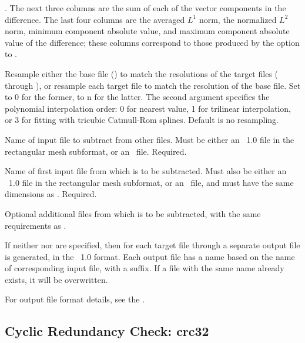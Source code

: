 \begin{description}
  .
  The next three columns are the sum of each of the vector components in
  the difference.  The last four columns are the averaged $L^1$ norm,
  the normalized $L^2$ norm, minimum component absolute value, and
  maximum component absolute value of the difference; these columns
  correspond to those produced by the  option to
  .
\item[\optkey{-resample \boa 0\pipe n\bca\  \boa 0\pipe 1\pipe 3\bca}]
  Resample either the base file () to match the resolutions of
  the target files ( through ), or resample each
  target file to match the resolution of the base file.  Set
   to 0 for the former, to n for the latter.  The second
  argument specifies the polynomial interpolation order: 0 for
  nearest value, 1 for trilinear interpolation, or 3 for fitting with
  tricubic Catmull-Rom splines.  Default is no resampling.
\item[\optkey{file-0}]
  Name of input file to subtract from other files.  Must be either
  an \OVF\ 1.0 file in the rectangular mesh subformat, or an \VIO\
  file.  Required.
\item[\optkey{file-1}]
  Name of first input file from which  is to be subtracted.
  Must also be either an \OVF\ 1.0 file in the rectangular mesh
  subformat, or an \VIO\ file, and must have the same dimensions as
  \cd{file-0}.  Required.
\item[\optkey{\ldots\ file-n}]
  Optional additional files from which  is to be
  subtracted, with the same requirements as .
\end{description}

If neither  nor  are specified, then for each target
file \cd{file-1} through \cd{file-n} a separate output file is
generated, in the \OVF\ 1.0 format.  Each output file has a name based
on the name of corresponding input file, with a \cd{-diff} suffix.  If a
file with the same name already exists, it will be overwritten.

For output file format details, see the .

\subsection{Cyclic Redundancy Check: crc32\label{sec:crc32}}%

